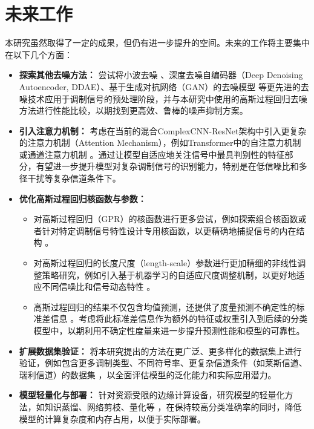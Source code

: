 \documentclass[conference]{IEEEtran}
\begin{document}
\section{未来工作}
本研究虽然取得了一定的成果，但仍有进一步提升的空间。未来的工作将主要集中在以下几个方面：

\begin{itemize}
    \item \textbf{探索其他去噪方法：} 尝试将小波去噪 \cite{[55]}\cite{[56]}、深度去噪自编码器（Deep Denoising Autoencoder, DDAE）\cite{[20]}、基于生成对抗网络（GAN）的去噪模型 \cite{[15]}\cite{[16]} 等更先进的去噪技术应用于调制信号的预处理阶段，并与本研究中使用的高斯过程回归去噪方法进行性能比较，以期找到更高效、鲁棒的噪声抑制方案。
    \item \textbf{引入注意力机制：} 考虑在当前的混合ComplexCNN-ResNet架构中引入更复杂的注意力机制（Attention Mechanism），例如Transformer中的自注意力机制 \cite{[39]}\cite{[40]} 或通道注意力机制 \cite{b5}。通过让模型自适应地关注信号中最具判别性的特征部分，有望进一步提升模型对复杂调制信号的识别能力，特别是在低信噪比和多径干扰等复杂信道条件下。
    \item \textbf{优化高斯过程回归核函数与参数：}
    \begin{itemize}
        \item 对高斯过程回归（GPR）的核函数进行更多尝试，例如探索组合核函数或者针对特定调制信号特性设计专用核函数，以更精确地捕捉信号的内在结构 \cite{[17]}\cite{[18]}。
        \item 对高斯过程回归的长度尺度（length-scale）参数进行更加精细的非线性调整策略研究，例如引入基于机器学习的自适应尺度调整机制，以更好地适应不同信噪比和信号动态特性 \cite{[1]}\cite{[63]}。
        \item 高斯过程回归的结果不仅包含均值预测，还提供了度量预测不确定性的标准差信息 \cite{[17]}\cite{[18]}。考虑将此标准差信息作为额外的特征或权重引入到后续的分类模型中，以期利用不确定性度量来进一步提升预测性能和模型的可靠性。
    \end{itemize}
    \item \textbf{扩展数据集验证：} 将本研究提出的方法在更广泛、更多样化的数据集上进行验证，例如包含更多调制类型、不同符号率、更复杂信道条件（如莱斯信道、瑞利信道）的数据集 \cite{[5]}\cite{[12]}，以全面评估模型的泛化能力和实际应用潜力。
    \item \textbf{模型轻量化与部署：} 针对资源受限的边缘计算设备，研究模型的轻量化方法，如知识蒸馏、网络剪枝、量化等 \cite{[5]}\cite{[11]}，在保持较高分类准确率的同时，降低模型的计算复杂度和内存占用，以便于实际部署。
\end{itemize}
\end{document}
